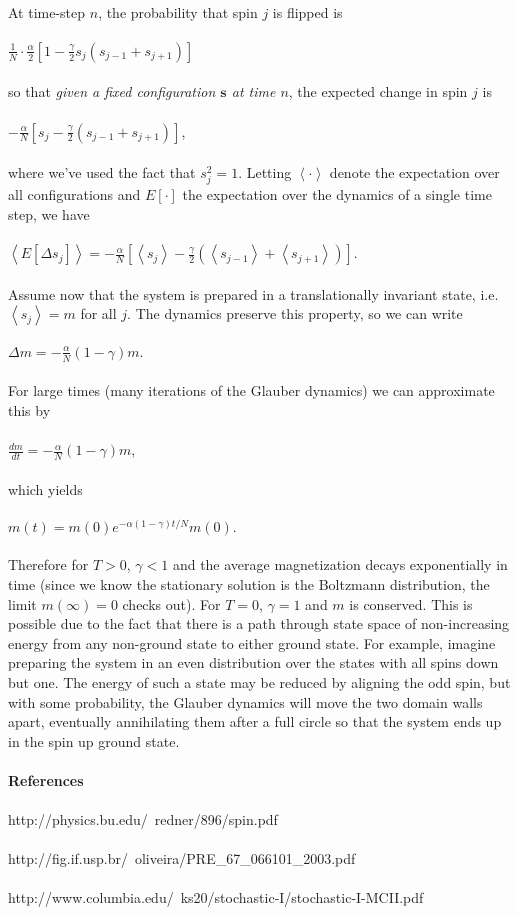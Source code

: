 \documentclass[]{article}
\begin{document}
\\
At time-step $n$, the probability that spin $j$ is flipped is\\
\\
$\frac{1}{N}\cdot\frac{\alpha}{2}\left[1-\frac{\gamma}{2}s_j(s_{j-1}+s_{j+1})\right]$\\
\\
so that \textit{given a fixed configuration $\mathbf{s}$ at time $n$}, the expected change in spin $j$ is\\
\\
$-\frac{\alpha}{N}\left[s_j-\frac{\gamma}{2}(s_{j-1}+s_{j+1})\right]$,\\
\\
where we've used the fact that $s_j^2=1$. Letting $\left\langle\cdot\right\rangle$ denote the expectation over all configurations and $E\left[\cdot\right]$ the expectation over the dynamics of a single time step, we have\\
\\
$\left\langle E\left[\Delta s_j\right]\right\rangle=-\frac{\alpha}{N}\left[\left\langle s_j\right\rangle-\frac{\gamma}{2}(\left\langle s_{j-1}\right\rangle+\left\langle s_{j+1}\right\rangle)\right].$\\
\\
Assume now that the system is prepared in a translationally invariant state, i.e. $\left\langle s_j\right\rangle=m$ for all $j$. The dynamics preserve this property, so we can write\\
\\
$\Delta m=-\frac{\alpha}{N}\left(1-\gamma\right)m.$\\
\\
For large times (many iterations of the Glauber dynamics) we can approximate this by\\
\\
$\frac{dm}{dt}=-\frac{\alpha}{N}(1-\gamma)m$,\\
\\
which yields\\
\\
$m(t)=m(0)e^{-\alpha(1-\gamma)t/N}m(0).$\\
\\
Therefore for $T>0$, $\gamma<1$ and the average magnetization decays exponentially in time (since we know the stationary solution is the Boltzmann distribution, the limit $m(\infty)=0$ checks out). For $T=0$, $\gamma=1$ and $m$ is conserved. This is possible due to the fact that there is a path through state space of non-increasing energy from any non-ground state to either ground state. For example, imagine preparing the system in an even distribution over the states with all spins down but one. The energy of such a state may be reduced by aligning the odd spin, but with some probability, the Glauber dynamics will move the two domain walls apart, eventually annihilating them after a full circle so that the system ends up in the spin up ground state.\\
\\
\textbf{References}\\
\\
http://physics.bu.edu/~redner/896/spin.pdf\\
\\
http://fig.if.usp.br/~oliveira/PRE\_67\_066101\_2003.pdf\\
\\
http://www.columbia.edu/~ks20/stochastic-I/stochastic-I-MCII.pdf
\end{document}
